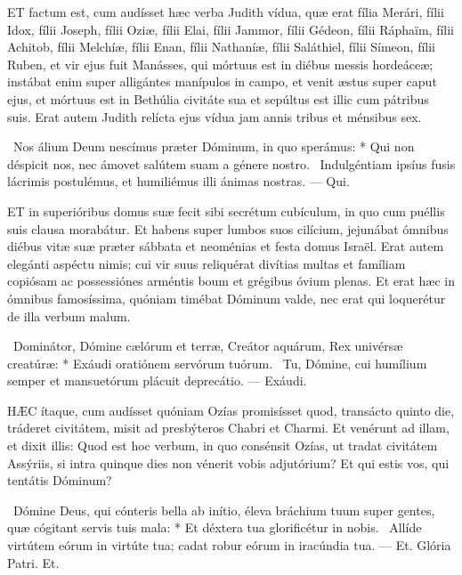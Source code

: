 


\lettrine[lines=2]{E}{T} factum est, cum audísset hæc verba Judith vídua, quæ erat fília Merári, fílii Idox, fílii Joseph, fílii Oziæ, fílii Elai, fílii Jammor, fílii Gédeon, fílii Ráphaïm, fílii Achitob, fílii Melchíæ, fílii Enan, fílii Nathaníæ, fílii Saláthiel, fílii Símeon, fílii Ruben, et vir ejus fuit Manásses, qui mórtuus est in diébus messis hordeáceæ; instábat enim super alligántes manípulos in campo, et venit æstus super caput ejus, et mórtuus est in Bethúlia civitáte sua et sepúltus est illic cum pátribus suis. Erat autem Judith relícta ejus vídua jam annis tribus et ménsibus sex.

\R\ Nos álium Deum nescímus præter Dóminum, in quo sperámus: * Qui non déspicit nos, nec ámovet salútem suam a génere nostro. \V\ Indulgéntiam ipsíus fusis lácrimis postulémus, et humiliémus illi ánimas nostras. — Qui.


\lettrine[lines=2]{E}{T} in superióribus domus suæ fecit sibi secrétum cubículum, in quo cum puéllis suis clausa morabátur. Et habens super lumbos suos cilícium, jejunábat ómnibus diébus vitæ suæ præter sábbata et neoménias et festa domus Israël. Erat autem elegánti aspéctu nimis; cui vir suus reliquérat divítias multas et famíliam copiósam ac possessiónes arméntis boum et grégibus óvium plenas. Et erat hæc in ómnibus famosíssima, quóniam timébat Dóminum valde, nec erat qui loquerétur de illa verbum malum.

\R\ Dominátor, Dómine cælórum et terræ, Creátor aquárum, Rex univérsæ creatúræ: * Exáudi oratiónem servórum tuórum. \V\ Tu, Dómine, cui humílium semper et mansuetórum plácuit deprecátio. — Exáudi.



\lettrine[lines=2]{H}{ÆC} ítaque, cum audísset quóniam Ozías promisísset quod, transácto quinto die, tráderet civitátem, misit ad presbýteros Chabri et Charmi. Et venérunt ad illam, et dixit illis: Quod est hoc verbum, in quo consénsit Ozías, ut tradat civitátem Assýriis, si intra quinque dies non vénerit vobis adjutórium? Et qui estis vos, qui tentátis Dóminum?

\R\ Dómine Deus, qui cónteris bella ab inítio, éleva bráchium tuum super gentes, quæ cógitant servis tuis mala: * Et déxtera tua glorificétur in nobis. \V\ Allíde virtútem eórum in virtúte tua; cadat robur eórum in iracúndia tua. — Et. Glória Patri. Et.

